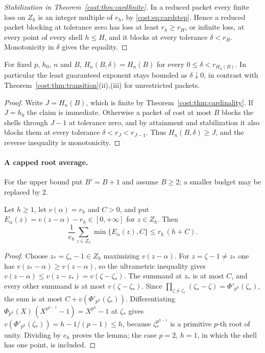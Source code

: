 \begin{proof}[Stabilization in Theorem~\ref{cost:thm:cardfinite}]
In a reduced packet every finite loss on $Z_h$ is an integer multiple of $r_h$, by
\eqref{cost:eq:cardstep}. Hence a reduced packet blocking at tolerance zero has loss at
least $r_h\ge r_H$, or infinite loss, at every point of every shell $h\le H$, and it blocks
at every tolerance $\delta<r_H$. Monotonicity in $\delta$ gives the equality.
\end{proof}

\begin{corollary}\label{cost:cor:cardtol}
For fixed $p$, $h_0$, $n$ and $B$, $H_n(B,\delta)=H_n(B)$ for every
$0\le\delta<r_{H_n(B)}$. In particular the least guaranteed exponent stays bounded as
$\delta\downarrow0$, in contrast with Theorem~\ref{cost:thm:transition}\textup{(ii),(iii)} for
unrestricted packets.
\end{corollary}

\begin{proof}
Write $J=H_n(B)$, which is finite by Theorem~\ref{cost:thm:cardinality}. If $J=h_0$ the claim
is immediate. Otherwise a packet of cost at most $B$ blocks the shells through $J-1$ at
tolerance zero, and by attainment and stabilization it also blocks them at every tolerance
$\delta<r_J<r_{J-1}$. Thus $H_n(B,\delta)\ge J$, and the reverse inequality is monotonicity.
\end{proof}

\paragraph{A capped root average.}
For the upper bound put $B'=B+1$ and assume $B\ge2$; a smaller budget may be replaced by
$2$.

\begin{lemma}\label{tors:lem:capped}\label{cost:lem:cardcap}
Let $h\ge1$, let $v(\alpha)=r_h$ and $C>0$, and put
$E_\alpha(z)=v(z-\alpha)-r_h\in[0,+\infty]$ for $z\in Z_h$. Then
\[
  \frac1{e_h}\sum_{z\in Z_h}\min\{E_\alpha(z),C\}\le r_h\,(h+C).
\]
\end{lemma}

\begin{proof}
Choose $z_*=\zeta_*-1\in Z_h$ maximizing $v(z-\alpha)$. For $z=\zeta-1\ne z_*$ one has
$v(z_*-\alpha)\ge v(z-\alpha)$, so the ultrametric inequality gives
$v(z-\alpha)\le v(z-z_*)=v(\zeta-\zeta_*)$. The summand at $z_*$ is at most $C$, and every other summand is
at most $v(\zeta-\zeta_*)$. Since
$\prod_{\zeta\ne\zeta_*}(\zeta_*-\zeta)=\Phi'_{p^h}(\zeta_*)$, the sum is at most
$C+v(\Phi'_{p^h}(\zeta_*))$. Differentiating
$\Phi_{p^h}(X)\,(X^{p^{h-1}}-1)=X^{p^h}-1$ at $\zeta_*$ gives
$v(\Phi'_{p^h}(\zeta_*))=h-1/(p-1)\le h$, because $\zeta_*^{p^{h-1}}$ is a primitive
$p$-th root of unity. Dividing by $e_h$ proves the lemma; the case $p=2$, $h=1$, in which
the shell has one point, is included.
\end{proof}

